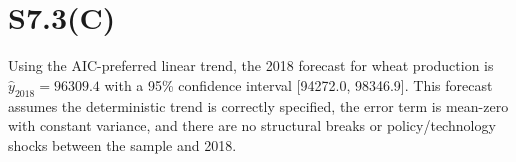 \documentclass{article}
\begin{document}
\section*{S7.3(C)}
Using the AIC-preferred linear trend, the 2018 forecast for wheat production is 
$\hat{y}_{2018} = 96309.4$ with a 95\% confidence interval 
[94272.0, 98346.9]. 
This forecast assumes the deterministic trend is correctly specified, the error term is mean-zero with constant variance, 
and there are no structural breaks or policy/technology shocks between the sample and 2018.
\end{document}

